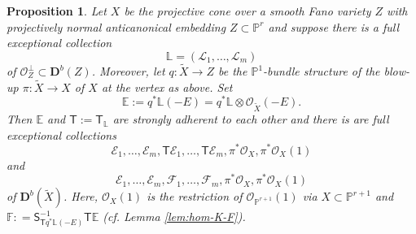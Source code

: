 \documentclass[a4paper,11pt, reqno]{amsart}
\def\E{\mathbb E}
\def\F{\mathbb F}
\def\L{\mathbb L}
\def\P{\mathbb P}
\def\DD{\mathbf D}
\def\OO{\mathcal O}
\def\sE{\mathscr{E}}
\def\sF{\mathscr{F}}
\def\sL{\mathscr{L}}
\def\Db{\DD^b}
\newcommand{\bS}{\mathsf{S}}
\newcommand{\bT}{\mathsf{T}}
\theoremstyle{plain}
\newtheorem{proposition}[dummy]{Proposition}
\theoremstyle{definition}
\numberwithin{equation}{section}
\begin{document}
\begin{proposition}\label{prop:full-exc-ProjCones}
    Let $X $ be the projective cone over a smooth Fano variety $Z$ with projectively normal anticanonical embedding $Z\subset \P^r$ and suppose there is a full exceptional collection 
    \[
    \L = (\sL_1 , \ldots , \sL_m )
    \]
    of $ \OO_Z^\perp \subset\Db(Z)$.
        Moreover, let $q \colon \tilde{X} \to  Z$ be the $\P^1$-bundle structure of the blow-up $\pi\colon \tilde{X} \to X$ of $X $ at the vertex as above. Set
    \[
    \E := q^\ast \L ( - E ) = q^\ast \L \otimes \OO_{\tilde{X}} (-E) .
    \]
Then $\E $ and $\bT:=\bT_{\L}$ are strongly adherent to each other and there is are full exceptional collections 
\begin{equation}\label{eq:full-exc-coll-E-TE}
    \sE_1 , \ldots , \sE_m , \bT \sE_1 , \ldots , \bT \sE_m , \pi^\ast\OO_{X} , \pi^\ast \OO_{X} (1) 
\end{equation}
and 
\begin{equation}\label{eq:full-exc-coll-E-F}
    \sE_1 , \ldots , \sE_m , \sF_1 , \ldots , \sF_m , \pi^\ast\OO_{X} , \pi^\ast \OO_{X} (1) 
\end{equation}
of $\Db( \tilde{X} )$.
Here, $\OO_X(1)$ is the restriction of $\OO_{\P^{r+1}}(1)$ via $X\subset \P^{r+1}$ and $\F  : = \bS^{-1}_{\bT q^\ast \L (-E)} \bT \E$ (cf. Lemma \ref{lem:hom-K-F}).
\end{proposition}
\end{document}
